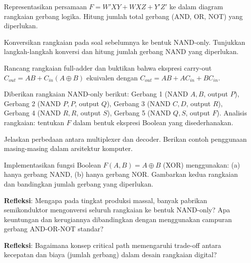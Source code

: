 \documentclass[../main]{subfiles}
\begin{document}

\begin{latihan}
  \item Representasikan persamaan $F = W'XY + WXZ + Y'Z'$ ke dalam diagram rangkaian gerbang logika. Hitung jumlah total gerbang (AND, OR, NOT) yang diperlukan.
  \item Konversikan rangkaian pada soal sebelumnya ke bentuk NAND-only. Tunjukkan langkah-langkah konversi dan hitung jumlah gerbang NAND yang diperlukan.
  \item Rancang rangkaian full-adder dan buktikan bahwa ekspresi carry-out $C_{out} = AB + C_{in}(A \oplus B)$ ekuivalen dengan $C_{out} = AB + AC_{in} + BC_{in}$.
  \item Diberikan rangkaian NAND-only berikut: Gerbang 1 (NAND $A,B$, output $P$), Gerbang 2 (NAND $P,P$, output $Q$), Gerbang 3 (NAND $C,D$, output $R$), Gerbang 4 (NAND $R,R$, output $S$), Gerbang 5 (NAND $Q,S$, output $F$). Analisis rangkaian: tentukan $F$ dalam bentuk ekspresi Boolean yang disederhanakan.
  \item Jelaskan perbedaan antara multiplexer dan decoder. Berikan contoh penggunaan masing-masing dalam arsitektur komputer.
  \item Implementasikan fungsi Boolean $F(A,B) = A \oplus B$ (XOR) menggunakan: (a) hanya gerbang NAND, (b) hanya gerbang NOR. Gambarkan kedua rangkaian dan bandingkan jumlah gerbang yang diperlukan.
  \item \textbf{Refleksi}: Mengapa pada tingkat produksi massal, banyak pabrikan semikonduktor mengonversi seluruh rangkaian ke bentuk NAND-only? Apa keuntungan dan kerugiannya dibandingkan dengan menggunakan campuran gerbang AND-OR-NOT standar?
  \item \textbf{Refleksi}: Bagaimana konsep critical path memengaruhi trade-off antara kecepatan dan biaya (jumlah gerbang) dalam desain rangkaian digital?
\end{latihan}

\end{document}
